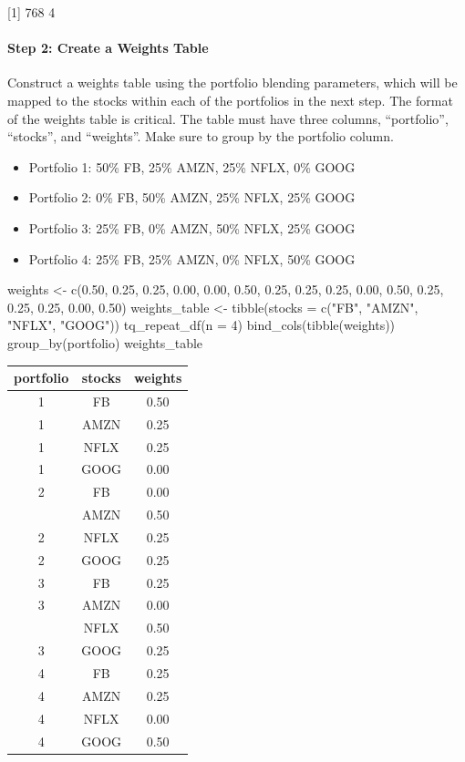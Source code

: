 {[}1{]} 768 4

\hspace{20 mm}

\paragraph{Step 2: Create a Weights
Table}\label{step-2-create-a-weights-table}

Construct a weights table using the portfolio blending parameters, which
will be mapped to the stocks within each of the portfolios in the next
step. The format of the weights table is critical. The table must have
three columns, ``portfolio'', ``stocks'', and ``weights''. Make sure to
group by the portfolio column.

\begin{itemize}
\tightlist
\item
  Portfolio 1: 50\% FB, 25\% AMZN, 25\% NFLX, 0\% GOOG
\item
  Portfolio 2: 0\% FB, 50\% AMZN, 25\% NFLX, 25\% GOOG
\item
  Portfolio 3: 25\% FB, 0\% AMZN, 50\% NFLX, 25\% GOOG
\item
  Portfolio 4: 25\% FB, 25\% AMZN, 0\% NFLX, 50\% GOOG
\end{itemize}

\begin{Schunk}
\begin{Sinput}
weights <- c(0.50, 0.25, 0.25, 0.00,
             0.00, 0.50, 0.25, 0.25,
             0.25, 0.00, 0.50, 0.25, 
             0.25, 0.25, 0.00, 0.50)
weights_table <- tibble(stocks = c("FB", "AMZN", "NFLX", "GOOG")) %
    tq_repeat_df(n = 4) %
    bind_cols(tibble(weights)) %
    group_by(portfolio)
weights_table
\end{Sinput}
\end{Schunk}

\begin{tabular}{ccc}
\toprule
portfolio & stocks & weights\\
\midrule
1 & FB & 0.50\\
1 & AMZN & 0.25\\
1 & NFLX & 0.25\\
1 & GOOG & 0.00\\
2 & FB & 0.00\\
\addlinespace
2 & AMZN & 0.50\\
2 & NFLX & 0.25\\
2 & GOOG & 0.25\\
3 & FB & 0.25\\
3 & AMZN & 0.00\\
\addlinespace
3 & NFLX & 0.50\\
3 & GOOG & 0.25\\
4 & FB & 0.25\\
4 & AMZN & 0.25\\
4 & NFLX & 0.00\\
4 & GOOG & 0.50\\
\bottomrule
\end{tabular}

